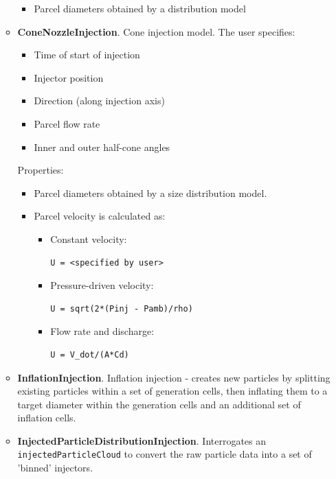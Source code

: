 \documentclass[12pt]{article}
\begin{document}
\begin{itemize}
\begin{itemize}
        \begin{itemize}
            \item Parcel diameters obtained by a distribution model
        \end{itemize}
        \item \textbf{ConeNozzleInjection}.
        Cone injection model.
        The user specifies:
        \begin{itemize}
            \item Time of start of injection
            \item Injector position
            \item Direction (along injection axis)
            \item Parcel flow rate
            \item Inner and outer half-cone angles
        \end{itemize}
        Properties:
        \begin{itemize}
            \item Parcel diameters obtained by a size distribution model.
            \item Parcel velocity is calculated as:
                \begin{itemize}
                    \item Constant velocity:
                        \begin{verbatim}
U = <specified by user>
                        \end{verbatim}
                    \item Pressure-driven velocity:
                        \begin{verbatim}
U = sqrt(2*(Pinj - Pamb)/rho)
                        \end{verbatim}
                    \item Flow rate and discharge:
                        \begin{verbatim}
U = V_dot/(A*Cd)
                        \end{verbatim}
                \end{itemize}
        \end{itemize}
        \item \textbf{InflationInjection}. Inflation injection - creates new particles by splitting existing particles within a set of generation cells, then inflating them to a target diameter within the generation cells and an additional set of inflation cells.
        \item \textbf{InjectedParticleDistributionInjection}. Interrogates an \texttt{injectedParticleCloud} to convert the raw particle data into a set of 'binned' injectors.

\end{itemize}
\end{itemize}
\end{document}
